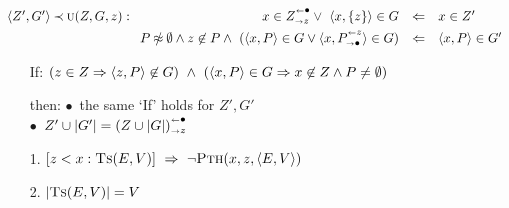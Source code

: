 \documentclass[leqno]{article}
\newcommand{\ky}[1]{{\tt #1}}
\newcommand{\ina}{\hspace*{1em}}
\newcommand{\inb}{\hspace*{2em}}
\newcommand{\inc}{\hspace*{3.5em}}
\newcommand{\func}[1]{\mbox{\sc #1}}
\newcommand{\f}[1]{\func{#1}}
\newcommand{\srt}[1]{{\cal #1}}
\newcommand{\ret}{\mbox{$\ \rightarrow\ $}}
\newcommand{\aft}[3]{[#1<#2:#3]}
\begin{document}
\noindent
$\<Z',G'\>\Incl \f{u}(Z,G,z) :
\begin{array}[t]{rcl}
x\in\rem Zz\lor\ \<x,\{z\}\>\in G    & \Leftarrow & x\in Z' \\[1ex]
P\notEq\es\land z\not\in P\land\ (\<x,P\>\in G\lor \<x,\add Pz\>\in G)
  & \Leftarrow & \<x,P\>\in G'
\end{array}
$ \\[3ex]
%
\begin{itemize}
\item[If:] %
$(z\in Z\impl \<z,P\>\not\in G)\ \land\ 
 (\<x,P\>\in G\impl x\not\in Z\land P\not=\es)$ 
\item[then:] $\bullet$\  the same `If' holds for $Z',G'$\\[1ex]
     $\bullet$\  $Z'\cup |G'| = \rem{(Z\cup |G|)}z$ 
\item[1.] $\aft zx{\f{Ts}(E,V)}\ \impl\ \neg \f{Pth}(x,z,\<E,V\>)$  
\item[2.] $|\f{Ts}(E,V)|  =  V $
\end{itemize}

\end{document}
